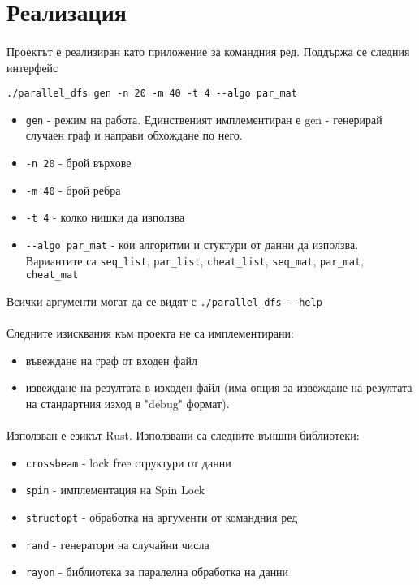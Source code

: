 \section{Реализация}

\paragraph*{} Проектът е реализиран като приложение за командния ред. Поддържа се следния интерфейс

\verb|./parallel_dfs gen -n 20 -m 40 -t 4 --algo par_mat|

\begin{itemize}
\item \verb|gen| - режим на работа. Единственият имплементиран е gen - генерирай случаен граф и направи обхождане по него.
\item \verb|-n 20| - брой върхове
\item \verb|-m 40| - брой ребра
\item \verb|-t 4| - колко нишки да използва
\item \verb|--algo par_mat| - кои алгоритми и стуктури от данни да използва. Вариантите са \verb|seq_list|, \verb|par_list|, \verb|cheat_list|, \verb|seq_mat|, \verb|par_mat|, \verb|cheat_mat|
\end{itemize}

Всички аргументи могат да се видят с \verb|./parallel_dfs --help|

\paragraph*{} Следните изисквания към проекта не са имплементирани:
\begin{itemize}
\item въвеждане на граф от входен файл
\item извеждане на резултата в изходен файл (има опция за извеждане на резултата на стандартния изход в "debug" формат).
\end{itemize}

\paragraph*{} Използван е езикът Rust. Използвани са следните външни библиотеки:
\begin{itemize}
\item \verb|crossbeam| - lock free структури от данни
\item \verb|spin| - имплементация на Spin Lock
\item \verb|structopt| - обработка на аргументи от командния ред
\item \verb|rand| - генератори на случайни числа
\item \verb|rayon| - библиотека за паралелна обработка на данни
\end{itemize}
